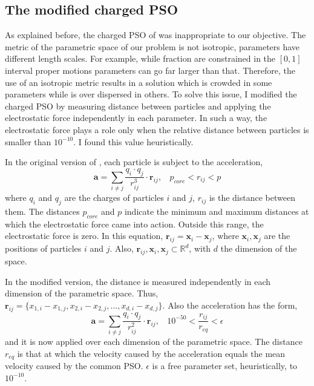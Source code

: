\subsection{The modified charged PSO}
\label{sect:chargedPSO}
As explained before, the charged PSO of \citet{Blackwell2002} was inappropriate to our objective. The metric of the parametric space of our problem is not isotropic, parameters have different length scales. For example, while fraction are constrained in the $[0,1]$ interval proper motions parameters can go far larger than that. Therefore, the use of an isotropic metric results in a solution which is crowded in some parameters while is over dispersed in others. 
To solve this issue, I modified the charged PSO by measuring distance between particles and applying the electrostatic force independently in each parameter. In such a way, the electrostatic force plays a role only when the relative distance between particles is smaller than $10^{-10}$. I found this value heuristically.

In the original version of  \citet{Blackwell2002}, each particle is subject to the acceleration,
\begin{equation}
\label{eq:PSOacc}
\mathbf{a}=\sum_{i\neq j} \frac{q_i \cdot q_j }{r_{ij}^3} \cdot \mathbf{r}_{ij}, \ \ \ \ p_{core} < r_{ij} < p
\end{equation}
where $q_i$ and $q_j$ are the charges of particles $i$ and $j$, $r_{ij}$ is the distance between them. The distances $p_{core}$ and $p$ indicate the minimum and maximum distances at which the electrostatic force came into action. Outside this range, the electrostatic force is zero. In this equation, $\mathbf{r}_{ij}= \mathbf{x}_i -\mathbf{x}_j$, where $\mathbf{x}_i,\mathbf{x}_j$ are the positions of particles $i$ and $j$. Also, $\mathbf{r}_{ij},\mathbf{x}_i,\mathbf{x}_j \subset \mathbb{R}^d$, with $d$ the dimension of the space. 

In the modified version, the distance is measured independently in each dimension of the parametric space. Thus, $\mathbf{r}_{ij}= \{x_{1,i} -x_{1,j},x_{2,i} -x_{2,j},...,x_{d,i} -x_{d,j}\}$. Also the acceleration has the form,
\begin{equation}
\label{eq:PSOacc}
\mathbf{a}=\sum_{i\neq j} \frac{q_i \cdot q_j }{r_{ij}^2} \cdot \mathbf{r}_{ij}, \ \ \ \  10^{-50} < \frac{r_{ij}}{r_{eq}} < \epsilon
\end{equation}
and it is now applied over each dimension of the parametric space. The distance $r_{eq}$ is that at which the velocity caused by the acceleration equals the mean velocity caused by the common PSO. $\epsilon$ is a free parameter set, heuristically, to $10^{-10}$.

